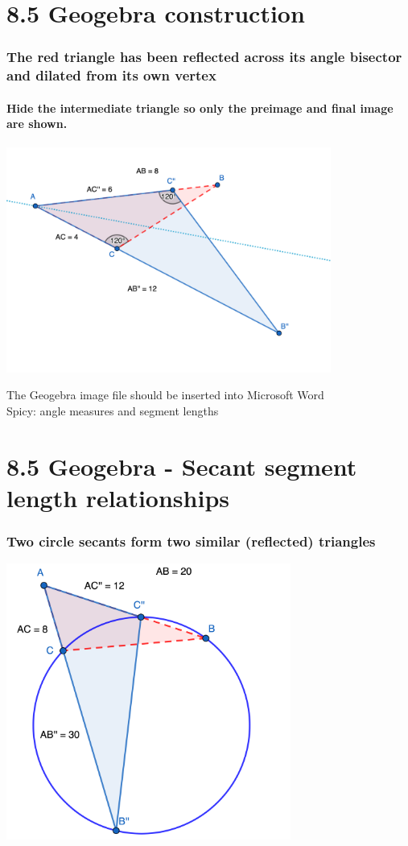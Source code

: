 \documentclass{beamer}
\begin{document}
\section{8.5 Geogebra construction}
  \frame
  {
    \frametitle{The red triangle has been reflected across its angle bisector and dilated from its own vertex}
    \framesubtitle{Hide the intermediate triangle so only the preimage and final image are shown.}

    \includegraphics[width=0.8\textwidth]{8-6Similar-Triangle-Reflection.png}

    The Geogebra image file should be inserted into Microsoft Word\\
    Spicy: angle measures and segment lengths
  }

\section{8.5 Geogebra - Secant segment length relationships}
  \frame
  {
    \frametitle{Two circle secants form two similar (reflected) triangles}

    \includegraphics[width=0.7\textwidth]{8-6Similar-Triangle-Circle.png}
  }
\end{document}
